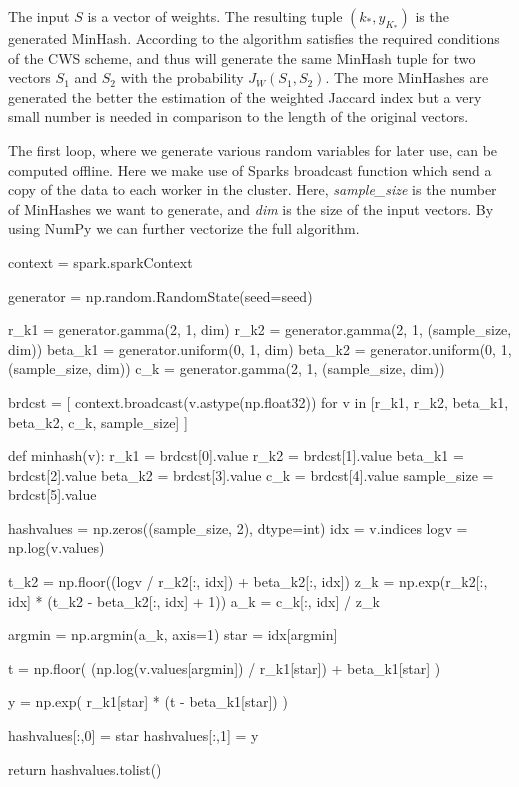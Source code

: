 \documentclass[../main.tex]{subfiles}
\begin{document}
The input $S$ is a vector of weights. The resulting tuple $(k_*,y_{K_*})$
is the generated MinHash. According to \cite{wu2018improved} the algorithm satisfies the required conditions of the CWS scheme, and thus will generate the same MinHash tuple for two vectors $S_1$ and $S_2$ with the probability $J_W(S_1,S_2)$. The more MinHashes are generated the better the estimation of the weighted Jaccard index but a very small number is needed in comparison to the length of the original vectors.

The first loop, where we generate various random variables for later use, can be computed offline. Here we make use of Sparks broadcast function which send a copy of the data to each worker in the cluster.
Here, \textit{sample\_size} is the number of MinHashes we want to generate, and \textit{dim} is the size of the input vectors. By using NumPy we can further vectorize the full algorithm.
\begin{python}
    context = spark.sparkContext

    generator = np.random.RandomState(seed=seed)

    r_k1 = generator.gamma(2, 1, dim)
    r_k2 = generator.gamma(2, 1, (sample_size, dim))
    beta_k1 = generator.uniform(0, 1, dim)
    beta_k2 = generator.uniform(0, 1, (sample_size, dim))
    c_k = generator.gamma(2, 1, (sample_size, dim))

    brdcst = [
        context.broadcast(v.astype(np.float32))
        for v in [r_k1, r_k2, beta_k1, beta_k2, c_k, sample_size]
    ]
\end{python}

\begin{python}
    def minhash(v):
        r_k1 = brdcst[0].value
        r_k2 = brdcst[1].value
        beta_k1 = brdcst[2].value
        beta_k2 = brdcst[3].value
        c_k = brdcst[4].value
        sample_size = brdcst[5].value
        
        hashvalues = np.zeros((sample_size, 2), dtype=int)
        idx = v.indices
        logv = np.log(v.values)

        t_k2 = np.floor((logv / r_k2[:, idx]) + beta_k2[:, idx])
        z_k = np.exp(r_k2[:, idx] * (t_k2 - beta_k2[:, idx] + 1))
        a_k = c_k[:, idx] / z_k

        argmin = np.argmin(a_k, axis=1)
        star = idx[argmin]

        t = np.floor(
            (np.log(v.values[argmin]) / r_k1[star]) + beta_k1[star]
        )
        
        y = np.exp(
            r_k1[star] * (t - beta_k1[star])
        )

        hashvalues[:,0] = star
        hashvalues[:,1] = y

        return hashvalues.tolist()
\end{python}
\end{document}
